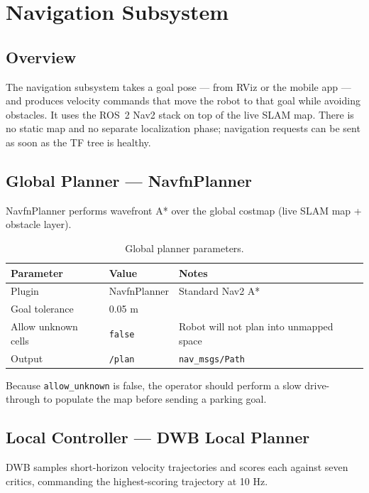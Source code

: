 \documentclass[12pt,a4paper]{report}
\begin{document}
\chapter{Navigation Subsystem}

\section{Overview}

The navigation subsystem takes a goal pose --- from RViz or the mobile app --- and produces velocity commands that move the robot to that goal while avoiding obstacles. It uses the ROS~2 Nav2 stack on top of the live SLAM map. There is no static map and no separate localization phase; navigation requests can be sent as soon as the TF tree is healthy.

\section{Global Planner --- NavfnPlanner}

NavfnPlanner performs wavefront A* over the global costmap (live SLAM map + obstacle layer).

\begin{table}[H]
\centering
\caption{Global planner parameters.}
\label{tab:planner}
\begin{tabularx}{\textwidth}{|p{4cm}|p{2cm}|X|}
\hline
\textbf{Parameter} & \textbf{Value} & \textbf{Notes} \\
\hline
Plugin & NavfnPlanner & Standard Nav2 A* \\
\hline
Goal tolerance & 0.05 m & \\
\hline
Allow unknown cells & \texttt{false} & Robot will not plan into unmapped space \\
\hline
Output & \texttt{/plan} & \texttt{nav\_msgs/Path} \\
\hline
\end{tabularx}
\end{table}

Because \texttt{allow\_unknown} is false, the operator should perform a slow drive-through to populate the map before sending a parking goal.

\section{Local Controller --- DWB Local Planner}

DWB samples short-horizon velocity trajectories and scores each against seven critics, commanding the highest-scoring trajectory at 10 Hz.
\end{document}

